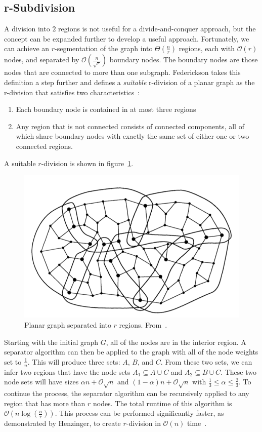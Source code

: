\documentclass[11pt]{article}
\begin{document}
\subsection{r-Subdivision}
\label{sec:graph-sep-rsub}

A division into $2$ regions is not useful for a divide-and-conquer approach, but the concept can be expanded further to develop a useful approach. Fortunately, we can achieve an $r$-segmentation of the graph into $\Theta \left (\frac{n}{r} \right )$ regions, each with $\mathcal{O}(r)$ nodes, and separated by $\mathcal{O} \left (\frac{n}{\sqrt{r}} \right )$ boundary nodes. The boundary nodes are those nodes that are connected to more than one subgraph. Federickson takes this definition a step further and defines a \textit{suitable} r-division of a planar graph as the r-division that satisfies two characteristics~\cite{federickson1987fast}:
\begin{enumerate}
    \item Each boundary node is contained in at most three regions
    
    \item Any region that is not connected consists of connected components, all of which share boundary nodes with exactly the same set of either one or two connected regions.
\end{enumerate}
A suitable $r$-division is shown in figure~\ref{fig:rsep}.

\begin{figure}[!htb]
    \centering
    \includegraphics[width=.5\textwidth]{rsep}
    \caption{Planar graph separated into $r$ regions. From~\cite{federickson1987fast}.}
    \label{fig:rsep}
\end{figure}

Starting with the initial graph $G$, all of the nodes are in the interior region. A separator algorithm can then be applied to the graph with all of the node weights set to $\frac{1}{n}$. This will produce three sets: $A$, $B$, and $C$. From these two sets, we can infer two regions that have the node sets $A_1 \subseteq A \cup C$ and $A_2 \subseteq B \cup C$. These two node sets will have sizes $\alpha n + \mathcal{O}\sqrt{n}$ and $(1 - \alpha) n + \mathcal{O}\sqrt{n}$ with $\frac{1}{3} \leq \alpha \leq \frac{2}{3}$. To continue the process, the separator algorithm can be recursively applied to any region that has more than $r$ nodes. The total runtime of this algorithm is $\mathcal{O} \left (n \log \left (\frac{n}{r} \right ) \right )$. This process can be performed significantly faster, as demonstrated by Henzinger, to create $r$-division in $\mathcal{O}(n)$ time~\cite{henzinger1997faster}.
\end{document}
